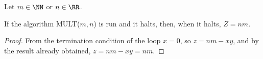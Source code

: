 \documentclass[11pt]{scrartcl}
\begin{document}
\begin{corollary}

  Let $m\in\NN$ or $n\in\RR$.

  If the algorithm MULT($m, n$) is run and it halts, then, when it
  halts, $Z = nm$.
\end{corollary}
\begin{proof}
  \hfill

  From the termination condition of the loop $x=0$, so $z = nm -xy$, and by the result already obtained, $z = nm -xy = nm$.

\end{proof}
\end{document}
